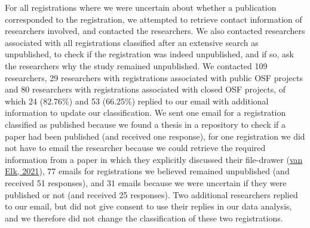 \documentclass[
  ,jou, a4paper,floatsintext]{apa6}
\begin{document}
For all registrations where we were uncertain about whether a publication corresponded to the registration, we attempted to retrieve contact information of researchers involved, and contacted the researchers. We also contacted researchers associated with all registrations classified after an extensive search as unpublished, to check if the registration was indeed unpublished, and if so, ask the researchers why the study remained unpublished. We contacted 109 researchers, 29 researchers with registrations associated with public OSF projects and 80 researchers with registrations associated with closed OSF projects, of which 24 (82.76\%) and 53 (66.25\%) replied to our email with additional information to update our classification. We sent one email for a registration classified as published because we found a thesis in a repository to check if a paper had been published (and received one response), for one registration we did not have to email the researcher because we could retrieve the required information from a paper in which they explicitly discussed their file-drawer (\protect\hyperlink{ref-van_elk_whats_2021}{van Elk, 2021}), 77 emails for registrations we believed remained unpublished (and received 51 responses), and 31 emails because we were uncertain if they were published or not (and received 25 responses). Two additional researchers replied to our email, but did not give consent to use their replies in our data analysis, and we therefore did not change the classification of these two registrations.
\end{document}
